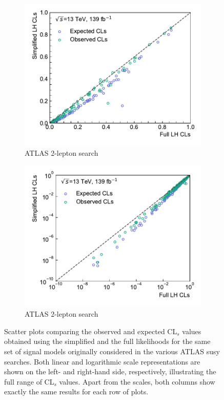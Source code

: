 \begin{figure}
\begin{subfigure}[b]{0.5\textwidth}
		\centering\includegraphics[width=\textwidth]{cls_scatter_2L0J_lin}
		\caption{ATLAS 2-lepton search~\cite{SUSY-2018-32}}
	\end{subfigure}\hfill
	\begin{subfigure}[b]{0.5\textwidth}
		\centering\includegraphics[width=\textwidth]{cls_scatter_2L0J_log}
		\caption{ATLAS 2-lepton search~\cite{SUSY-2018-32}}
	\end{subfigure}\hfill
	\caption{Scatter plots comparing the observed and expected CL$_s$ values obtained using the simplified and the full likelihoods for the same set of signal models originally considered in the various ATLAS \gls{susy} searches. Both linear and logarithmic scale representations are shown on the left- and right-hand side, respectively, illustrating the full range of CL$_s$ values. Apart from the scales, both columns show exactly the same results for each row of plots.}\label{fig:app_results_cls_1}
\end{figure}


